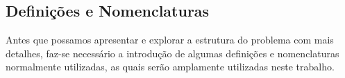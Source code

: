 \documentclass[12pt,a4paper]{article}
\begin{document}


\subsection{Definições e Nomenclaturas}
\label{sec:definicoes}

Antes que possamos apresentar e explorar a estrutura do problema com mais detalhes, faz-se
necessário a introdução de algumas definições e nomenclaturas normalmente utilizadas, as quais serão
amplamente utilizadas neste trabalho.
\end{document}
